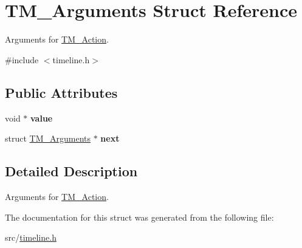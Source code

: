 \hypertarget{structTM__Arguments}{\section{\-T\-M\-\_\-\-Arguments \-Struct \-Reference}
\label{structTM__Arguments}
}


\-Arguments for \hyperlink{structTM__Action}{\-T\-M\-\_\-\-Action}.  




{\ttfamily \#include $<$timeline.\-h$>$}

\subsection*{\-Public \-Attributes}
\begin{DoxyCompactItemize}
\item 
\hypertarget{structTM__Arguments_a06f62ef608ece43ba73964a168d8d21f}{void $\ast$ {\bfseries value}}\label{structTM__Arguments_a06f62ef608ece43ba73964a168d8d21f}

\item 
\hypertarget{structTM__Arguments_ac4cfcd43fc4a1df0b4dc7cfdf41e9a16}{struct \hyperlink{structTM__Arguments}{\-T\-M\-\_\-\-Arguments} $\ast$ {\bfseries next}}\label{structTM__Arguments_ac4cfcd43fc4a1df0b4dc7cfdf41e9a16}

\end{DoxyCompactItemize}


\subsection{\-Detailed \-Description}
\-Arguments for \hyperlink{structTM__Action}{\-T\-M\-\_\-\-Action}. 

\-The documentation for this struct was generated from the following file\-:\begin{DoxyCompactItemize}
\item 
src/\hyperlink{timeline_8h}{timeline.\-h}\end{DoxyCompactItemize}

